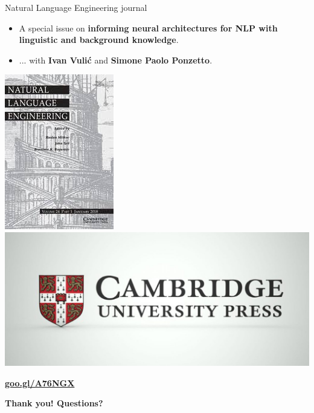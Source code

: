 \begin{frame}{Natural Language Engineering journal}

\vspace{-8pt} 
\begin{itemize}
\item A special issue on \textbf{\alert{informing neural architectures for NLP with linguistic and background knowledge}}.
\item ... with \textbf{Ivan Vuli\'c} and \textbf{Simone Paolo Ponzetto}. 
 \end{itemize}

\begin{center}
	\includegraphics[width=.2\textwidth]{figures/nle-journal}
	\includegraphics[width=.63\textwidth]{figures/cambridge-core}
\end{center}

\textbf{\LARGE \alert{\url{goo.gl/A76NGX}}}
	
	
\end{frame}


\begin{frame}{\alert{\textbf{Thank you! Questions?}} }



\end{frame}


